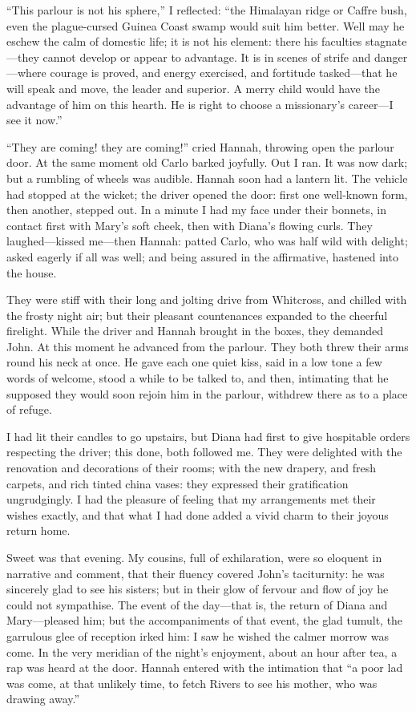 \enquote{This parlour is not his sphere,} I reflected: \enquote{the
Himalayan ridge or Caffre bush, even the plague-cursed Guinea Coast
swamp would suit him better. Well may he eschew the calm of domestic
life; it is not his element: there his faculties stagnate---they cannot
develop or appear to advantage. It is in scenes of strife and
danger---where courage is proved, and energy exercised, and fortitude
tasked---that he will speak and move, the leader and superior. A merry
child would have the advantage of him on this hearth. He is right to
choose a missionary's career---I see it now.}

\enquote{They are coming! they are coming!} cried Hannah, throwing open
the parlour door. At the same moment old Carlo barked joyfully. Out I
ran. It was now dark; but a rumbling of wheels was audible. Hannah
soon had a lantern lit. The vehicle had stopped at the wicket; the
driver opened the door: first one well-known form, then another, stepped
out. In a minute I had my face under their bonnets, in contact first
with Mary's soft cheek, then with Diana's flowing curls. They
laughed---kissed me---then Hannah: patted Carlo, who was half wild with
delight; asked eagerly if all was well; and being assured in the
affirmative, hastened into the house.

They were stiff with their long and jolting drive from Whitcross, and
chilled with the frosty night air; but their pleasant countenances
expanded to the cheerful firelight. While the driver and Hannah brought
in the boxes, they demanded \St{} John. At this moment he advanced from
the parlour. They both threw their arms round his neck at once. He
gave each one quiet kiss, said in a low tone a few words of welcome,
stood a while to be talked to, and then, intimating that he supposed
they would soon rejoin him in the parlour, withdrew there as to a place
of refuge.

I had lit their candles to go upstairs, but Diana had first to give
hospitable orders respecting the driver; this done, both followed me. 
They were delighted with the renovation and decorations of their rooms;
with the new drapery, and fresh carpets, and rich tinted china vases:
they expressed their gratification ungrudgingly. I had the pleasure of
feeling that my arrangements met their wishes exactly, and that what I
had done added a vivid charm to their joyous return home.

Sweet was that evening. My cousins, full of exhilaration, were so
eloquent in narrative and comment, that their fluency covered \St{} John's
taciturnity: he was sincerely glad to see his sisters; but in their glow
of fervour and flow of joy he could not sympathise. The event of the
day---that is, the return of Diana and Mary---pleased him; but the
accompaniments of that event, the glad tumult, the garrulous glee of
reception irked him: I saw he wished the calmer morrow was come. In the
very meridian of the night's enjoyment, about an hour after tea, a rap
was heard at the door. Hannah entered with the intimation that
\enquote{a poor lad was come, at that unlikely time, to fetch \Mr{} Rivers
to see his mother, who was drawing away.}

